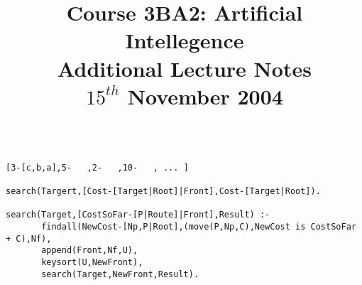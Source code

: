\documentclass[a4paper,12pt]{article}
\begin{document}
\title{Course 3BA2: Artificial Intellegence \\ Additional Lecture Notes \\ $15^{th}$ November 2004}

\maketitle

\begin{verbatim}

[3-[c,b,a],5-   ,2-   ,10-   , ... ]

search(Targert,[Cost-[Target|Root]|Front],Cost-[Target|Root]).

search(Target,[CostSoFar-[P|Route]|Front],Result) :-
       findall(NewCost-[Np,P|Root],(move(P,Np,C),NewCost is CostSoFar + C),Nf),
       append(Front,Nf,U),
       keysort(U,NewFront),
       search(Target,NewFront,Result).

\end{verbatim}


\end{document}
